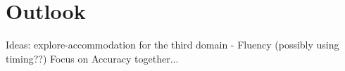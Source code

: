 \chapter{Outlook}
%

Ideas: explore-accommodation for the third domain - Fluency (possibly using timing??)  Focus on Accuracy together...